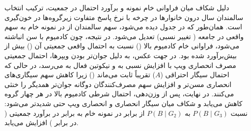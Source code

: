 \documentclass[12pt]{exam}
\begin{document}
\begin{table}[htbp]
\centering
\caption{مقایسه فراوانی نسبی خام نمونه با برآورد احتمال در جمعیت (وزن ) برای رویدادهای حاشیه‌ای و شرطی}
\end{table}

دلیل شکاف میان فراوانی خام نمونه و برآورد احتمال در جمعیت، ترکیب انتخاب  سالمندان  سال درون خانوارها در چرخه  با نرخ پاسخ متفاوت زیرگروه‌ها در خون‌گیری است. همان‌طور که در جدول دیده می‌شود، سهم سالمندان از  در نمونه خام به سهم واقعی  در جامعه ( تغییر نسبی) تعدیل می‌شود. در نتیجه، چون کادمیوم با سن انباشته می‌شود، فراوانی خام کادمیوم بالا () نسبت به احتمال واقعی جمعیتی آن () بیش از  بیش‌برآورد شده بود. در جهت عکس، به دلیل جوان‌تر بودن ویپرها، احتمال جمعیتی مصرف انحصاری ویپ با  افزایش نسبی به  و نیکوتین فعال به  می‌رسد، در حالی که احتمال سیگار احتراقی ($A$) تقریباً ثابت می‌ماند () زیرا کاهش سهم سیگاری‌های انحصاری مسن‌تر و افزایش سهم مصرف‌کنندگان دوگانه جوان‌تر همدیگر را خنثی می‌کنند. در نهایت، پس از وزن‌دهی، احتمال شرطی کادمیوم بالا در هر چهار گروه کاهش می‌یابد و شکاف میان سیگار انحصاری و انحصاری ویپ حتی شدیدتر می‌شود: نسبت $P(B \mid G_3)$ به $P(B \mid G_2)$ از  برابر در نمونه خام به  برابر در برآورد جمعیتی ( در برابر ) افزایش می‌یابد.
\end{document}
